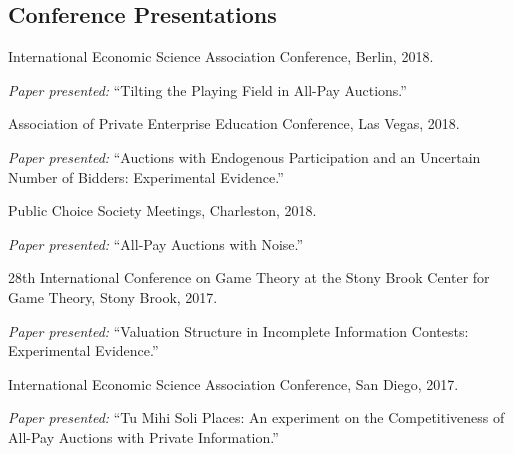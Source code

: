 \documentclass{article}%
\renewenvironment{itemize}{
\begin{list}{}{
\setlength{\leftmargin}{1.5em}
}
}{
\end{list}
}
\begin{document}

\subsection*{Conference Presentations}

\begin{itemize}

\item International Economic Science Association Conference, Berlin, 2018.
\begin{itemize}\vspace{-.24cm}
\item \textit{Paper presented:} ``Tilting the Playing Field in All-Pay Auctions.''
\end{itemize}

\item Association of Private Enterprise Education Conference, Las Vegas, 2018.
\begin{itemize}\vspace{-.24cm}
\item \textit{Paper presented:} ``Auctions with Endogenous Participation and an Uncertain Number of Bidders: Experimental Evidence.''
\end{itemize}

\item Public Choice Society Meetings, Charleston, 2018.
\begin{itemize}\vspace{-.24cm}
\item \textit{Paper presented:} ``All-Pay Auctions with Noise.''
\end{itemize}

\item 28th International Conference on Game Theory at the Stony Brook Center for Game Theory, Stony Brook, 2017.
\begin{itemize}\vspace{-.24cm}
\item \textit{Paper presented:} ``Valuation Structure in Incomplete Information Contests: Experimental Evidence.''
\end{itemize}


\item International Economic Science Association Conference, San Diego, 2017.
\begin{itemize}\vspace{-.24cm}
\item \textit{Paper presented:} ``Tu Mihi Soli Places: An experiment on the Competitiveness of All-Pay Auctions with Private Information.''
\end{itemize}



\end{itemize}
\end{document}
